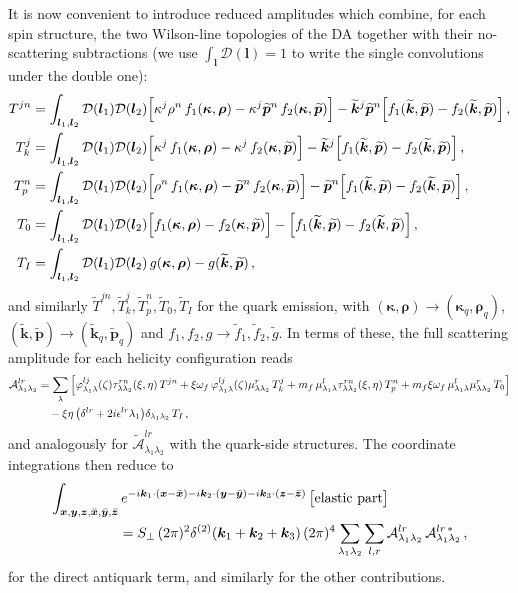 \documentclass[11pt,a4paper]{article}
\newcommand{\calD}{\mathcal{D}}
\newcommand{\Spe}{S_{\perp}}
\newcommand{\vx}{\bm{x}}
\newcommand{\vy}{\bm{y}}
\newcommand{\vz}{\bm{z}}
\newcommand{\vxb}{\bar{\bm{x}}}
\newcommand{\vyb}{\bar{\bm{y}}}
\newcommand{\vzb}{\bar{\bm{z}}}
\newcommand{\vk}{\bm{k}}
\newcommand{\vl}{\bm{l}}
\newcommand{\kt}{\widetilde{\bm{k}}}
\newcommand{\pt}{\widetilde{\bm{p}}}
\newcommand{\ktq}{\widetilde{\bm{k}}_{q}}
\newcommand{\ptq}{\widetilde{\bm{p}}_{q}}
\numberwithin{equation}{section}
\begin{document}
It is now convenient to introduce reduced amplitudes which combine, for each spin structure,
the two Wilson-line topologies of the DA together with their no-scattering subtractions
(we use $\int_{\vl}\calD(\vl)=1$ to write the single convolutions under the double one):
\begin{align}
\label{eq:Tdef}
T^{jn} & = \int_{\vl_{1},\vl_{2}}\calD(\vl_{1})\calD(\vl_{2})
\Big[\kappa^{j}\rho^{n}\,f_{1}(\bm\kappa,\bm\rho)
-\kappa^{j}\pt^{n}\,f_{2}(\bm\kappa,\pt)\Big]
-\kt^{j}\pt^{n}\Big[f_{1}(\kt,\pt)-f_{2}(\kt,\pt)\Big]\,,\notag \\
T^{j}_{k} & = \int_{\vl_{1},\vl_{2}}\calD(\vl_{1})\calD(\vl_{2})
\Big[\kappa^{j}\,f_{1}(\bm\kappa,\bm\rho)-\kappa^{j}\,f_{2}(\bm\kappa,\pt)\Big]
-\kt^{j}\Big[f_{1}(\kt,\pt)-f_{2}(\kt,\pt)\Big]\,,\notag \\
T^{n}_{p} & = \int_{\vl_{1},\vl_{2}}\calD(\vl_{1})\calD(\vl_{2})
\Big[\rho^{n}\,f_{1}(\bm\kappa,\bm\rho)-\pt^{n}\,f_{2}(\bm\kappa,\pt)\Big]
-\pt^{n}\Big[f_{1}(\kt,\pt)-f_{2}(\kt,\pt)\Big]\,,\notag \\
T_{0} & = \int_{\vl_{1},\vl_{2}}\calD(\vl_{1})\calD(\vl_{2})
\Big[f_{1}(\bm\kappa,\bm\rho)-f_{2}(\bm\kappa,\pt)\Big]
-\Big[f_{1}(\kt,\pt)-f_{2}(\kt,\pt)\Big]\,,\notag\\
T_{I} & = \int_{\vl_{1},\vl_{2}}\calD(\vl_{1})\calD(\vl_{2})\,g(\bm\kappa,\bm\rho)
-g(\kt,\pt)\,,
\end{align}
and similarly $\widetilde T^{jn},\widetilde T^{j}_{k},\widetilde T^{n}_{p},\widetilde T_{0},
\widetilde T_{I}$ for the quark emission, with
$(\bm\kappa,\bm\rho)\to(\bm\kappa_{q},\bm\rho_{q})$, $(\kt,\pt)\to(\ktq,\ptq)$ and
$f_{1},f_{2},g\to\widetilde f_{1},\widetilde f_{2},\widetilde g$. In terms of these, the full
scattering amplitude for each helicity configuration reads
\begin{align}
\label{eq:Ael}
\mathcal{A}^{lr}_{\lambda_{1}\lambda_{2}} & = \sum_{\lambda}
\Big[\varphi^{lj}_{\lambda_{1}\lambda}(\zeta)\tau^{rn}_{\lambda\lambda_{2}}(\xi,\eta)\,T^{jn}
+\xi\omega_{f}\,\varphi^{lj}_{\lambda_{1}\lambda}(\zeta)\mu^{r}_{\lambda\lambda_{2}}\,T^{j}_{k}
+m_{f}\,\mu^{l}_{\lambda_{1}\lambda}\tau^{rn}_{\lambda\lambda_{2}}(\xi,\eta)\,T^{n}_{p}
+m_{f}\xi\omega_{f}\,\mu^{l}_{\lambda_{1}\lambda}\mu^{r}_{\lambda\lambda_{2}}\,T_{0}\Big]
\notag\\
&\quad -\xi\eta\,\big(\delta^{lr}+2i\epsilon^{lr}\lambda_{1}\big)
\delta_{\lambda_{1}\lambda_{2}}\,T_{I}\,,
\end{align}
and analogously for $\widetilde{\mathcal{A}}^{lr}_{\lambda_1\lambda_2}$ with the quark-side
structures. The coordinate integrations then reduce to
\begin{align}
\int_{\vx,\vy,\vz,\vxb,\vyb,\vzb}&\,e^{-i\vk_{1}\cdot(\vx-\vxb)-i\vk_{2}\cdot(\vy-\vyb)
-i\vk_{3}\cdot(\vz-\vzb)}\,\big[\text{elastic part}\big] \notag\\
&= \Spe\,(2\pi)^{2}\delta^{(2)}(\vk_{1}+\vk_{2}+\vk_{3})\,(2\pi)^{4}
\sum_{\lambda_{1}\lambda_{2}}\sum_{l,r}\mathcal{A}^{lr}_{\lambda_{1}\lambda_{2}}\,
\mathcal{A}^{lr\,*}_{\lambda_{1}\lambda_{2}}\,,
\end{align}
for the direct antiquark term, and similarly for the other contributions.
\end{document}
